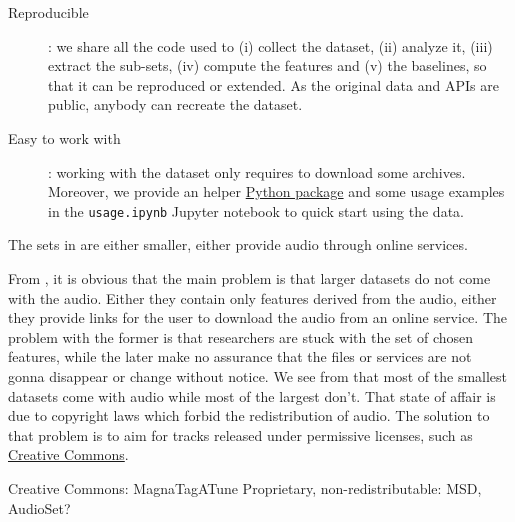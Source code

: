 \documentclass{article}
\begin{document}
\begin{description}
	\item[Reproducible]: we share all the code used to (i) collect the dataset, (ii) analyze it, (iii) extract the sub-sets, (iv) compute the features and (v) the baselines, so that it can be reproduced or extended. As the original data and APIs are public, anybody can recreate the dataset.
	\item[Easy to work with]: working with the dataset only requires to download some archives. Moreover, we provide an helper \href{https://pypi.python.org/pypi/freemusicarchive}{Python package} and some usage examples in the \texttt{usage.ipynb} Jupyter notebook to quick start using the data.
\end{description}



The sets in  are either smaller, either provide audio through online services.

From , it is obvious that the main problem is that larger datasets do not come with the audio. Either they contain only features derived from the audio, either they provide links for the user to download the audio from an online service. The problem with the former is that researchers are stuck with the set of chosen features, while the later make no assurance that the files or services are not gonna disappear or change without notice.
We see from  that most of the smallest datasets come with audio while most of the largest don't. That state of affair is due to copyright laws which forbid the redistribution of audio. The solution to that problem is to aim for tracks released under permissive licenses, such as \href{https://creativecommons.org/}{Creative Commons}.

Creative Commons: MagnaTagATune
Proprietary, non-redistributable: MSD, AudioSet?

\end{document}
